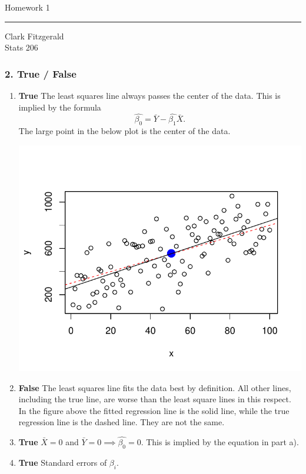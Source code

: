 \documentclass[12pt]{article}
\begin{document}
\begin{center}
    {\Large Homework 1}\\
    \bigskip
    \bigskip
    \hrule
    \medskip
    Clark Fitzgerald\\
    Stats 206
\end{center}

\subsubsection*{2. True / False}
\begin{enumerate}[label=\alph*]
\item  \textbf{True} The least squares line always passes the center of the data.
This is implied by the formula
\[
    \hat{\beta_0} = \bar{Y} - \hat{\beta_1} \bar{X}.
\]
The large point in the below plot is the center of the data.

\centerline{\includegraphics{regress.pdf}}

\item \textbf{False} The least squares line fits the data
best by definition. All other lines, including the true line, are worse
than the least square lines in this respect. 
In the figure above the fitted regression line is the solid line,
while the true regression line is the dashed line. They are not the same.

\item \textbf{True} $\bar{X} = 0$ and $\bar{Y} = 0 \implies \hat{\beta_0} =
0$. This is implied by the equation in part a).

\item \textbf{True} Standard errors of $\beta_i$. 


\end{enumerate}
\end{document}
